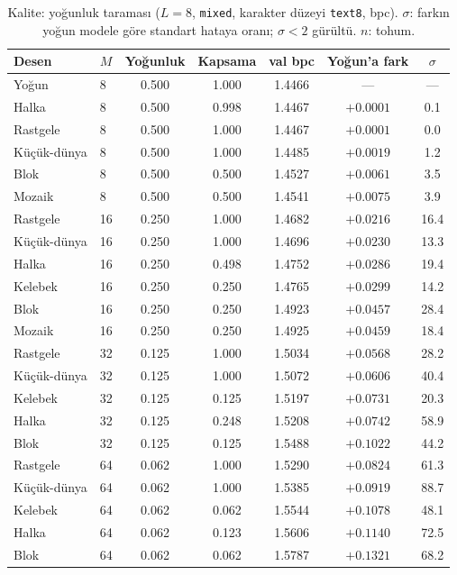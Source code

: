 \documentclass[10pt,journal]{IEEEtran}
\begin{document}
\begin{table}[!t]
\centering
\footnotesize
\caption{Kalite: yoğunluk taraması ($L{=}8$, \texttt{mixed}, karakter düzeyi \texttt{text8},
bpc). $\sigma$: farkın yoğun modele göre standart hataya oranı; $\sigma<2$ gürültü. $n$: tohum.}
\label{tab:kalite}
\begin{tabular}{@{}llccccc@{}}
\toprule
Desen & $M$ & Yoğunluk & Kapsama & val bpc & Yoğun'a fark & $\sigma$ \\
\midrule
Yoğun          & 8  & 0.500 & 1.000 & 1.4466 & ---       & ---  \\
Halka          & 8  & 0.500 & 0.998 & 1.4467 & $+0.0001$ & 0.1  \\
Rastgele       & 8  & 0.500 & 1.000 & 1.4467 & $+0.0001$ & 0.0  \\
Küçük-dünya    & 8  & 0.500 & 1.000 & 1.4485 & $+0.0019$ & 1.2  \\
Blok           & 8  & 0.500 & 0.500 & 1.4527 & $+0.0061$ & 3.5  \\
Mozaik         & 8  & 0.500 & 0.500 & 1.4541 & $+0.0075$ & 3.9  \\
\midrule
Rastgele       & 16 & 0.250 & 1.000 & 1.4682 & $+0.0216$ & 16.4 \\
Küçük-dünya    & 16 & 0.250 & 1.000 & 1.4696 & $+0.0230$ & 13.3 \\
Halka          & 16 & 0.250 & 0.498 & 1.4752 & $+0.0286$ & 19.4 \\
Kelebek        & 16 & 0.250 & 0.250 & 1.4765 & $+0.0299$ & 14.2 \\
Blok           & 16 & 0.250 & 0.250 & 1.4923 & $+0.0457$ & 28.4 \\
Mozaik         & 16 & 0.250 & 0.250 & 1.4925 & $+0.0459$ & 18.4 \\
\midrule
Rastgele       & 32 & 0.125 & 1.000 & 1.5034 & $+0.0568$ & 28.2 \\
Küçük-dünya    & 32 & 0.125 & 1.000 & 1.5072 & $+0.0606$ & 40.4 \\
Kelebek        & 32 & 0.125 & 0.125 & 1.5197 & $+0.0731$ & 20.3 \\
Halka          & 32 & 0.125 & 0.248 & 1.5208 & $+0.0742$ & 58.9 \\
Blok           & 32 & 0.125 & 0.125 & 1.5488 & $+0.1022$ & 44.2 \\
\midrule
Rastgele       & 64 & 0.062 & 1.000 & 1.5290 & $+0.0824$ & 61.3 \\
Küçük-dünya    & 64 & 0.062 & 1.000 & 1.5385 & $+0.0919$ & 88.7 \\
Kelebek        & 64 & 0.062 & 0.062 & 1.5544 & $+0.1078$ & 48.1 \\
Halka          & 64 & 0.062 & 0.123 & 1.5606 & $+0.1140$ & 72.5 \\
Blok           & 64 & 0.062 & 0.062 & 1.5787 & $+0.1321$ & 68.2 \\
\bottomrule
\end{tabular}
\end{table}
\end{document}
